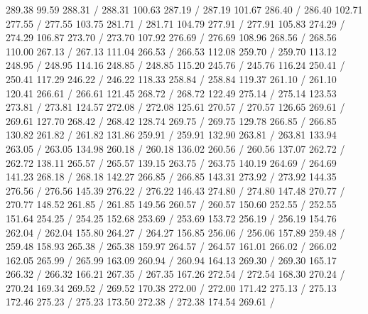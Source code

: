 { 289.38 99.59 288.31 /
 288.31 100.63 287.19 /
 287.19 101.67 286.40 /
 286.40 102.71 277.55 /
 277.55 103.75 281.71 /
 281.71 104.79 277.91 /
 277.91 105.83 274.29 /
 274.29 106.87 273.70 /
 273.70 107.92 276.69 /
 276.69 108.96 268.56 /
 268.56 110.00 267.13 /
 267.13 111.04 266.53 /
 266.53 112.08 259.70 /
 259.70 113.12 248.95 /
 248.95 114.16 248.85 /
 248.85 115.20 245.76 /
 245.76 116.24 250.41 /
 250.41 117.29 246.22 /
 246.22 118.33 258.84 /
 258.84 119.37 261.10 /
 261.10 120.41 266.61 /
 266.61 121.45 268.72 /
 268.72 122.49 275.14 /
 275.14 123.53 273.81 /
 273.81 124.57 272.08 /
 272.08 125.61 270.57 /
 270.57 126.65 269.61 /
 269.61 127.70 268.42 /
 268.42 128.74 269.75 /
 269.75 129.78 266.85 /
 266.85 130.82 261.82 /
 261.82 131.86 259.91 /
 259.91 132.90 263.81 /
 263.81 133.94 263.05 /
 263.05 134.98 260.18 /
 260.18 136.02 260.56 /
 260.56 137.07 262.72 /
 262.72 138.11 265.57 /
 265.57 139.15 263.75 /
 263.75 140.19 264.69 /
 264.69 141.23 268.18 /
 268.18 142.27 266.85 /
 266.85 143.31 273.92 /
 273.92 144.35 276.56 /
 276.56 145.39 276.22 /
 276.22 146.43 274.80 /
 274.80 147.48 270.77 /
 270.77 148.52 261.85 /
 261.85 149.56 260.57 /
 260.57 150.60 252.55 /
 252.55 151.64 254.25 /
 254.25 152.68 253.69 /
 253.69 153.72 256.19 /
 256.19 154.76 262.04 /
 262.04 155.80 264.27 /
 264.27 156.85 256.06 /
 256.06 157.89 259.48 /
 259.48 158.93 265.38 /
 265.38 159.97 264.57 /
 264.57 161.01 266.02 /
 266.02 162.05 265.99 /
 265.99 163.09 260.94 /
 260.94 164.13 269.30 /
 269.30 165.17 266.32 /
 266.32 166.21 267.35 /
 267.35 167.26 272.54 /
 272.54 168.30 270.24 /
 270.24 169.34 269.52 /
 269.52 170.38 272.00 /
 272.00 171.42 275.13 /
 275.13 172.46 275.23 /
 275.23 173.50 272.38 /
 272.38 174.54 269.61 /
}
